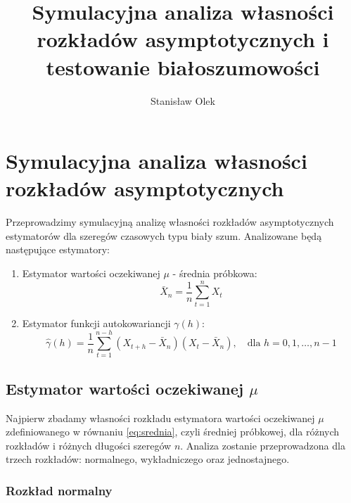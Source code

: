 \documentclass[10pt, a4paper]{article}\usepackage[]{graphicx}\usepackage[]{xcolor}
\begin{document}

\title{Symulacyjna analiza własności rozkładów asymptotycznych i testowanie białoszumowości}
\author{Stanisław Olek}
\maketitle
\tableofcontents

\section{Symulacyjna analiza własności rozkładów asymptotycznych}

Przeprowadzimy symulacyjną analizę własności rozkładów asymptotycznych estymatorów dla szeregów czasowych typu biały szum. Analizowane będą następujące estymatory:

\begin{enumerate}
  \item Estymator wartości oczekiwanej $\mu$ - średnia próbkowa:
  \begin{equation}
  \bar{X}_n=\frac{1}{n}\sum_{t=1}^n X_t
  \label{eq:srednia}
  \end{equation}
  
  \item Estymator funkcji autokowariancji $\gamma(h)$:
  \begin{equation}
  \hat{\gamma}(h)=\frac{1}{n}\sum_{t=1}^{n-h}(X_{t+h}-\bar{X}_n)(X_t-\bar{X}_n), \quad \text{dla } h=0,1,\ldots,n-1
  \label{eq:autokowariancja}
  \end{equation}
  
\end{enumerate}


\subsection{Estymator wartości oczekiwanej $\mu$}
Najpierw zbadamy własności rozkładu estymatora wartości oczekiwanej $\mu$ zdefiniowanego w równaniu \eqref{eq:srednia}, czyli średniej próbkowej, dla różnych rozkładów i różnych długości szeregów $n$. Analiza zostanie przeprowadzona dla trzech rozkładów: normalnego, wykładniczego oraz jednostajnego.

\newpage
\subsubsection{Rozkład normalny}
\end{document}
